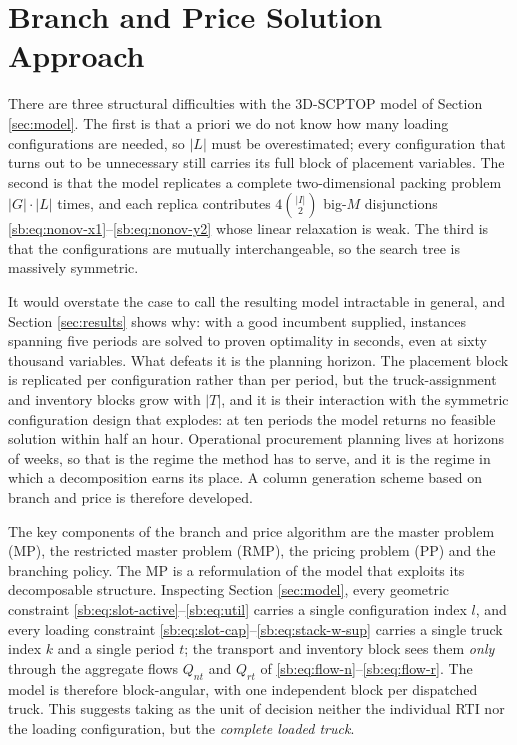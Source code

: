 \begingroup\color{blue}
\section{Branch and Price Solution Approach}
\label{sec:math}

There are three structural difficulties with the 3D-SCPTOP model of
Section \ref{sec:model}. The first is that a priori we do not know how
many loading configurations are needed, so $|L|$ must be
overestimated; every configuration that turns out to be unnecessary
still carries its full block of placement variables. The second is
that the model replicates a complete two-dimensional packing problem
$|G|\cdot|L|$ times, and each replica contributes
$4\binom{|I|}{2}$ big-$M$ disjunctions
\eqref{sb:eq:nonov-x1}--\eqref{sb:eq:nonov-y2} whose linear
relaxation is weak. The third is that the configurations are mutually
interchangeable, so the search tree is massively symmetric.

It would overstate the case to call the resulting model intractable in
general, and Section \ref{sec:results} shows why: with a good
incumbent supplied, instances spanning five periods are solved to
proven optimality in seconds, even at sixty thousand variables. What
defeats it is the planning horizon. The placement block is replicated
per configuration rather than per period, but the truck-assignment and
inventory blocks grow with $|T|$, and it is their interaction with the
symmetric configuration design that explodes: at ten periods the model
returns no feasible solution within half an hour. Operational
procurement planning lives at horizons of weeks, so that is the regime
the method has to serve, and it is the regime in which a decomposition
earns its place. A column generation scheme based on branch and price
is therefore developed.

The key components of the branch and price algorithm are the master
problem (MP), the restricted master problem (RMP), the pricing
problem (PP) and the branching policy. The MP is a reformulation of
the model that exploits its decomposable structure. Inspecting
Section \ref{sec:model}, every geometric constraint
\eqref{sb:eq:slot-active}--\eqref{sb:eq:util} carries a single
configuration index $l$, and every loading constraint
\eqref{sb:eq:slot-cap}--\eqref{sb:eq:stack-w-sup} carries a single
truck index $k$ and a single period $t$; the transport and inventory
block sees them \emph{only} through the aggregate flows $Q_{nt}$ and
$Q_{rt}$ of \eqref{sb:eq:flow-n}--\eqref{sb:eq:flow-r}. The model is
therefore block-angular, with one independent block per dispatched
truck. This suggests taking as the unit of decision neither the
individual RTI nor the loading configuration, but the
\emph{complete loaded truck}.

